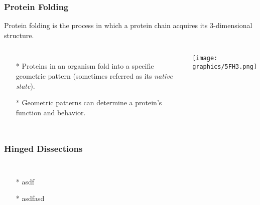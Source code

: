 \documentclass{beamer}
\begin{document}
  \begin{frame}
    \frametitle{Protein Folding}
    Protein folding is the process in which a protein chain acquires its 3-dimensional structure.
    \begin{columns}[c] %
     \begin{itemize}
     	\item[*] Proteins in an organism fold into a specific geometric pattern (sometimes referred as its \textit{native state}).
     	\item[*]  Geometric patterns can determine a protein's function and behavior. 
     \end{itemize}
	     \begin{minipage}{\linewidth}
			\begin{center}
			\texttt{[image: graphics/5FH3.png]}
			\end{center}
		\end{minipage}
    \end{columns}
  \end{frame}

  \begin{frame}
    \frametitle{Hinged Dissections}
     \begin{columns}[c] 
     \begin{itemize}
     	\item[*] asdf
     	\item[*] asdfasd
     \end{itemize}
    \begin{minipage}{\linewidth}
			\begin{center}
			\end{center}
		\end{minipage}
    \end{columns}
  \end{frame}
\end{document}
